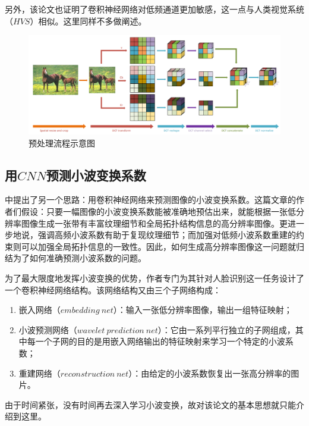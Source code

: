 \documentclass[UTF8]{ctexart}
\begin{document}
            \indent 另外，该论文也证明了卷积神经网络对低频通道更加敏感，这一点与人类视觉系统（$HVS$）相似。这里同样不多做阐述。
    			
    			\begin{figure}[htbp]
    				\centering 
         			\includegraphics[scale=0.5]{pre-processing.png} 
    				\caption{预处理流程示意图} 
    				\label{pre-processing}
    			\end{figure}
        \subsection{用$CNN$预测小波变换系数}
            
            \indent \cite{huang2017wavelet}中提出了另一个思路：用卷积神经网络来预测图像的小波变换系数。这篇文章的作者们假设：只要一幅图像的小波变换系数能被准确地预估出来，就能根据一张低分辨率图像生成一张带有丰富纹理细节和全局拓扑结构信息的高分辨率图像。更进一步地说，强调高频小波系数有助于复现纹理细节；而加强对低频小波系数重建的约束则可以加强全局拓扑信息的一致性。因此，如何生成高分辨率图像这一问题就归结为了如何准确预测小波系数的问题。
            
            \indent 为了最大限度地发挥小波变换的优势，作者专门为其针对人脸识别这一任务设计了一个卷积神经网络结构。该网络结构又由三个子网络构成：
            
    			\begin{enumerate}[leftmargin=50pt]
    				\item 嵌入网络（$embedding\ net$）：输入一张低分辨率图像，输出一组特征映射；
    				\item 小波预测网络（$wavelet\ prediction\ net$）：它由一系列平行独立的子网组成，其中每一个子网的目的是用嵌入网络输出的特征映射来学习一个特定的小波系数；
                    \item 重建网络（$reconstruction\ net$）：由给定的小波系数恢复出一张高分辨率的图片。
    			\end{enumerate}
                
            \indent 由于时间紧张，没有时间再去深入学习小波变换，故对该论文的基本思想就只能介绍到这里。
            
\end{document}
